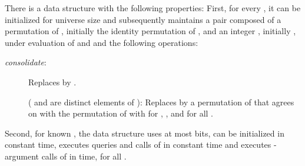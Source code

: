 \documentclass[envcountsame,envcountsect,undated,nolinenumbers]{lnthi}
\def\Tvn#1{\hbox{\textit{#1\/}}}
\begin{document}
\begin{lemma}
\label{lem:permutation}There is a data structure with the following properties:
First, for every , it can be
initialized for universe size  and
subsequently maintains a pair 
composed of a permutation  of ,
initially the identity permutation
 of , and an integer , initially ,
under evaluation of  and 
and the following operations:

\begin{description}
\item[{\normalfont \Tvn{consolidate}:}]
Replaces  by .
\item[{\normalfont }]
( and  are distinct
elements of ):
Replaces  by a permutation of  that agrees
on  with the permutation
 of  with  for
, ,
and  for all
.
\end{description}

\noindent
Second, for known , the data structure uses at most
 bits,
can be initialized in constant time, executes queries
and calls of  in constant time and
executes -argument calls of 
in  time, for all .
\end{lemma}
\end{document}
